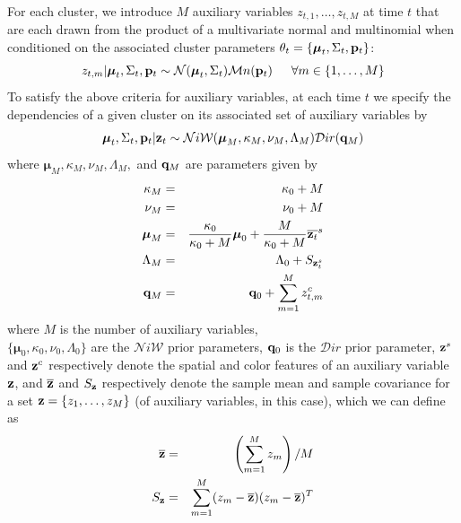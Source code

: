 \documentclass[twocolumn, final]{svjour3}
\begin{document}
For each cluster, we introduce $M$ auxiliary variables $z_{t, 1}, \ldots, z_{t, M}$ at time $t$ that are each drawn from the product of a multivariate normal and multinomial when conditioned on the associated cluster parameters $\theta_{t} = \{ \boldsymbol{\mu}_{t}, \Sigma_{t}, \bold{p}_{t} \}$:
\begin{equation}
\label{transker1}
z_{t, m} | \boldsymbol{\mu}_{t}, \Sigma_{t}, \bold{p}_{t}  \sim  \mathcal{N}(\boldsymbol{\mu}_{t}, \Sigma_{t}) \mathcal{M}n(\bold{p}_{t})   \hspace{15pt}   
\forall m \in \{ 1, \ldots, M \}
\end{equation}
To satisfy the above criteria for auxiliary variables, at each time $t$ we specify the dependencies of a given cluster on its associated set of auxiliary variables by
\begin{equation}
\label{transker2}
\boldsymbol{\mu}_{t}, \Sigma_{t}, \bold{p}_{t} | \bold{z}_t  \sim  \mathcal{N}i\mathcal{W}(\boldsymbol{\mu}_{M}, \kappa_{M}, \nu_{M}, \Lambda_{M})  \mathcal{D}ir(\bold{q}_{M})
\end{equation}
where $\boldsymbol{\mu}_{M}, \kappa_{M}, \nu_{M}, \Lambda_{M},$ and $\bold{q}_{M}$ are parameters given by
\begin{eqnarray}
\kappa_{M} &=& \kappa_{0} + M \\
\nu_{M} &=& \nu_{0} + M \\
\boldsymbol{\mu}_{M} &=& \frac{\kappa_{0}}{\kappa_{0}+M} \boldsymbol{\mu}_{0}  +  \frac{M}{\kappa_{0}+M} \overline{\bold{z}_t}^{s}\\
\Lambda_{M} &=& \Lambda_{0} + S_{\bold{z}_{t}^{s}}\\
\bold{q}_{M} &=& \bold{q}_{0} + \sum_{m=1}^{M} z_{t,m}^{c}
\end{eqnarray}
where $M$ is the number of auxiliary variables, \\
$\{ \boldsymbol{\mu}_{0}, \kappa_{0}, \nu_{0}, \Lambda_{0} \}$ are the $\mathcal{N}i\mathcal{W}$ prior parameters, $\bold{q}_{0}$ is the $\mathcal{D}ir$ prior parameter, $\bold{z}^{s}$ and $\bold{z}^{c}$ respectively denote the spatial and color features of an auxiliary variable $\bold{z}$, and $\overline{\bold{z}}$ and $S_{\bold{z}}$ respectively denote the sample mean and sample covariance for a set $\bold{z} = \{ z_{1}, \ldots, z_{M} \}$ (of auxiliary variables, in this case), which we can define as
\begin{eqnarray}
\label{samplemean}
\overline{\bold{z}}  &=&  \left( \sum_{m=1}^{M} z_{m} \right) / M\\
\label{samplecov}
S_{\bold{z}}  &=&  \sum_{m=1}^{M} (z_{m} - \overline{\bold{z}}) (z_{m} - \overline{\bold{z}})^{T}
\end{eqnarray}
\end{document}
